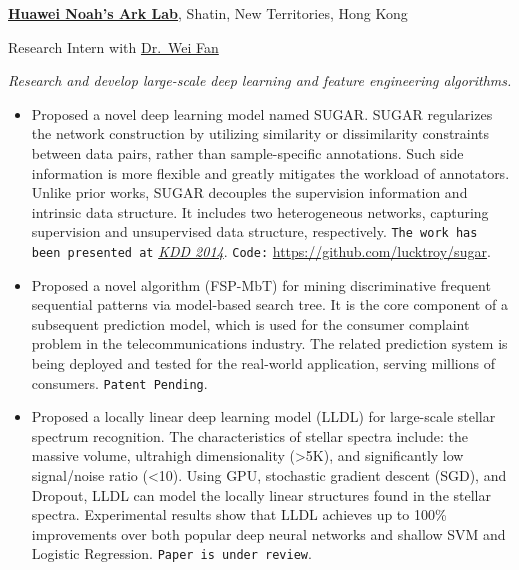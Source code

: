 \documentclass[10pt,a4paper]{article}
\renewenvironment{description}{
  \begin{basedescript}{\desclabelstyle{\pushlabel}\desclabelwidth{8em}}
}{
  \end{basedescript}
}
\begin{document}
\begin{description}
\item[05/2013 - present]
\href{http://www.noahlab.com.hk/}{\textbf{Huawei Noah's Ark Lab}},
Shatin, New Territories, Hong Kong

Research Intern with \href{http://www.weifan.info/}{Dr.~Wei Fan}

\emph{Research and develop large-scale deep learning and feature
engineering algorithms.}

\begin{itemize}
\itemsep1pt\parskip0pt
\item
  \small Proposed a novel deep learning model named SUGAR. SUGAR
  regularizes the network construction by utilizing similarity or
  dissimilarity constraints between data pairs, rather than
  sample-specific annotations. Such side information is more flexible
  and greatly mitigates the workload of annotators. Unlike prior works,
  SUGAR decouples the supervision information and intrinsic data
  structure. It includes two heterogeneous networks, capturing
  supervision and unsupervised data structure, respectively.
  \texttt{The work has been presented at}
  \href{http://www.kdd.org/kdd2014/}{\emph{KDD 2014}}. \texttt{Code:}
  \url{https://github.com/lucktroy/sugar}.
\end{itemize}

\begin{itemize}
\itemsep1pt\parskip0pt
\item
  \small Proposed a novel algorithm (FSP-MbT) for mining discriminative
  frequent sequential patterns via model-based search tree. It is the
  core component of a subsequent prediction model, which is used for the
  consumer complaint problem in the telecommunications industry. The
  related prediction system is being deployed and tested for the
  real-world application, serving millions of consumers.
  \texttt{Patent Pending}.
\end{itemize}

\begin{itemize}
\itemsep1pt\parskip0pt
\item
  \small Proposed a locally linear deep learning model (LLDL) for
  large-scale stellar spectrum recognition. The characteristics of
  stellar spectra include: the massive volume, ultrahigh dimensionality
  (\textgreater{}5K), and significantly low signal/noise ratio
  (\textless{}10). Using GPU, stochastic gradient descent (SGD), and
  Dropout, LLDL can model the locally linear structures found in the
  stellar spectra. Experimental results show that LLDL achieves up to
  100\% improvements over both popular deep neural networks and shallow
  SVM and Logistic Regression. \texttt{Paper is under review}.
\end{itemize}
\end{description}
\end{document}
